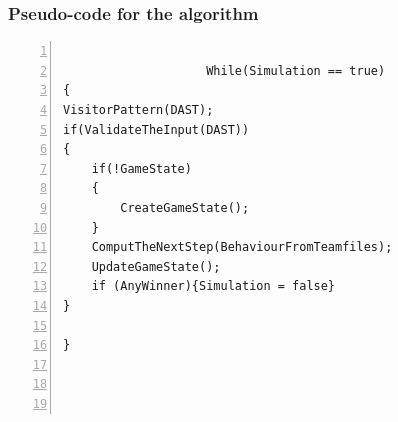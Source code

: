 \subsubsection{Pseudo-code for the algorithm}
					\begin{lstlisting}[basicstyle=\small\sffamily,
					keywords={break,case,const,continue,default,else,enum,
					for,if,return,switch,while,do,long,void,int,float,double,
					char,struct,typedef,include,size\_t},
					keywordstyle={\color{blue}},
					comment={[l]{//}}, morecomment={[s]{/*}{*/}}, commentstyle=\itshape,
					columns={[l]flexible}, numbers=left, numberstyle=\tiny,
					frameround=fftt, frame=shadowbox, captionpos=b,
					caption={Team file},
					label=LST:code31]
					
					While(Simulation == true)
{
VisitorPattern(DAST);
if(ValidateTheInput(DAST))
{
	if(!GameState)
	{
		CreateGameState();
	}
	ComputTheNextStep(BehaviourFromTeamfiles);
	UpdateGameState();
	if (AnyWinner){Simulation = false}
}

}
						
					
					
					\end{lstlisting}










